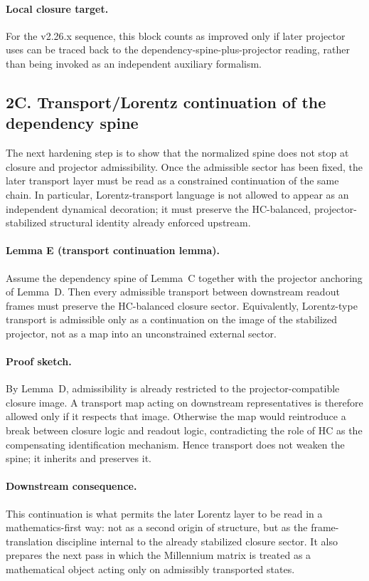 \paragraph{Local closure target.}
For the v2.26.x sequence, this block counts as improved only if later projector
uses can be traced back to the dependency-spine-plus-projector reading, rather
than being invoked as an independent auxiliary formalism.

\subsection*{2C. Transport/Lorentz continuation of the dependency spine}
The next hardening step is to show that the normalized spine does not stop at
closure and projector admissibility. Once the admissible sector has been fixed,
the later transport layer must be read as a constrained continuation of the same
chain. In particular, Lorentz-transport language is not allowed to appear as an
independent dynamical decoration; it must preserve the HC-balanced,
projector-stabilized structural identity already enforced upstream.

\paragraph{Lemma E (transport continuation lemma).}
Assume the dependency spine of Lemma~C together with the projector anchoring of
Lemma~D. Then every admissible transport between downstream readout frames must
preserve the HC-balanced closure sector. Equivalently, Lorentz-type transport is
admissible only as a continuation on the image of the stabilized projector, not
as a map into an unconstrained external sector.

\paragraph{Proof sketch.}
By Lemma~D, admissibility is already restricted to the projector-compatible
closure image. A transport map acting on downstream representatives is therefore
allowed only if it respects that image. Otherwise the map would reintroduce a
break between closure logic and readout logic, contradicting the role of HC as
the compensating identification mechanism. Hence transport does not weaken the
spine; it inherits and preserves it.

\paragraph{Downstream consequence.}
This continuation is what permits the later Lorentz layer to be read in a
mathematics-first way: not as a second origin of structure, but as the
frame-translation discipline internal to the already stabilized closure sector.
It also prepares the next pass in which the Millennium matrix is treated as a
mathematical object acting only on admissibly transported states.

